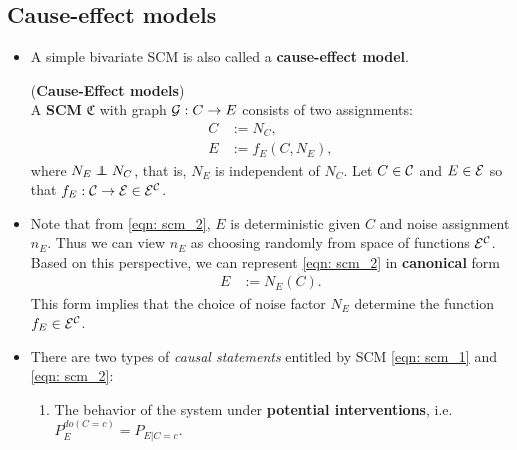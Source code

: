 \documentclass[11pt]{article}
\begin{document}
\subsection{Cause-effect models}
\begin{itemize}
\item A simple bivariate SCM is also called a \textbf{cause-effect model}.
 \begin{definition} (\textbf{Cause-Effect models}) \citep{peters2017elements}\\
A \textbf{SCM} $\mathfrak{C}$ with graph ${\mathcal G}: C \rightarrow E$ consists of two assignments:
\begin{align}
C &:= N_{C},  \label{eqn: scm_1}\\
E &:= f_{E}(C, N_E), \label{eqn: scm_2}
\end{align} where $N_E \indep N_C$, that is, $N_E$ is independent of $N_C$. Let $C \in {\mathcal C}$ and $E \in {\mathcal E}$ so that $f_E: {\mathcal C} \rightarrow {\mathcal E} \in {\mathcal E}^{{\mathcal C}}$.
\end{definition}


\item Note that from \eqref{eqn: scm_2}, $E$ is deterministic given $C$ and noise assignment  $n_E$. Thus we can view $n_E$ as choosing randomly from space of functions ${\mathcal E}^{{\mathcal C}}$. Based on this perspective, we can represent \eqref{eqn: scm_2} in \textbf{canonical} form 
\begin{align*}
E &:= N_{E}(C).
\end{align*} This form implies that the choice of noise factor $N_E$ determine the function $f_{E} \in {\mathcal E}^{{\mathcal C}}$.

\item There are two types of \emph{causal statements} entitled by SCM \eqref{eqn: scm_1} and \eqref{eqn: scm_2}:
\begin{enumerate}
\item The behavior of the system under \textbf{potential interventions}, i.e. $P_{E}^{do(C=c)} = P_{E|C=c}$. 


\end{enumerate}
\end{itemize}
\end{document}
